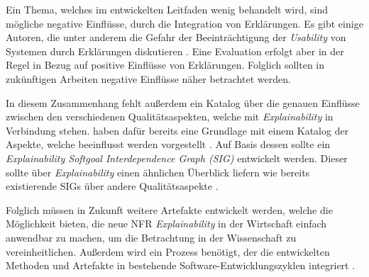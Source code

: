 Ein Thema, welches im entwickelten Leitfaden wenig behandelt wird, sind mögliche negative Einflüsse, durch die Integration von Erklärungen. Es gibt einige Autoren, die unter anderem die Gefahr der Beeinträchtigung der \textit{Usability} von Systemen durch Erklärungen diskutieren \cite{chazette_knowledge_nodate,koo_understanding_2016,kohl_explainability_2019}. Eine Evaluation erfolgt aber in der Regel in Bezug auf positive Einflüsse von Erklärungen. Folglich sollten in zukünftigen Arbeiten negative Einflüsse näher  betrachtet werden.

In diesem Zusammenhang fehlt außerdem ein Katalog über die genauen Einflüsse zwischen den verschiedenen Qualitätsaspekten, welche mit \textit{Explainability} in Verbindung stehen. \citeauthor{chazette_knowledge_nodate} haben dafür bereits eine Grundlage mit einem Katalog der Aspekte, welche beeinflusst werden vorgestellt \cite{chazette_knowledge_nodate}. Auf Basis dessen sollte ein \textit{Explainability Softgoal Interdependence Graph (SIG)} entwickelt werden. Dieser sollte über \textit{Explainability} einen ähnlichen Überblick liefern wie bereits existierende SIGs über andere Qualitätsaspekte \cite[vgl.][]{do2010software, carvalho2020developers}.

Folglich müssen in Zukunft weitere Artefakte entwickelt werden, welche die Möglichkeit bieten, die neue NFR \textit{Explainability} in der Wirtschaft einfach anwendbar zu machen, um die Betrachtung in der Wissenschaft zu vereinheitlichen\cite{sokol_explainability_2020}. Außerdem wird ein Prozess benötigt, der die entwickelten Methoden und Artefakte in bestehende Software-Entwicklungszyklen integriert \cite{kohl_explainability_2019, cassens_ambient_2019}.
